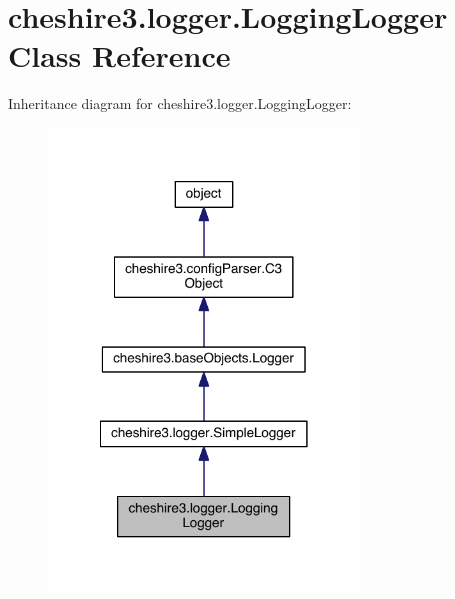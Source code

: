 \hypertarget{classcheshire3_1_1logger_1_1_logging_logger}{\section{cheshire3.\-logger.\-Logging\-Logger Class Reference}
\label{classcheshire3_1_1logger_1_1_logging_logger}
}


Inheritance diagram for cheshire3.\-logger.\-Logging\-Logger\-:
\nopagebreak
\begin{figure}[H]
\begin{center}
\leavevmode
\includegraphics[width=234pt]{classcheshire3_1_1logger_1_1_logging_logger__inherit__graph}
\end{center}
\end{figure}


